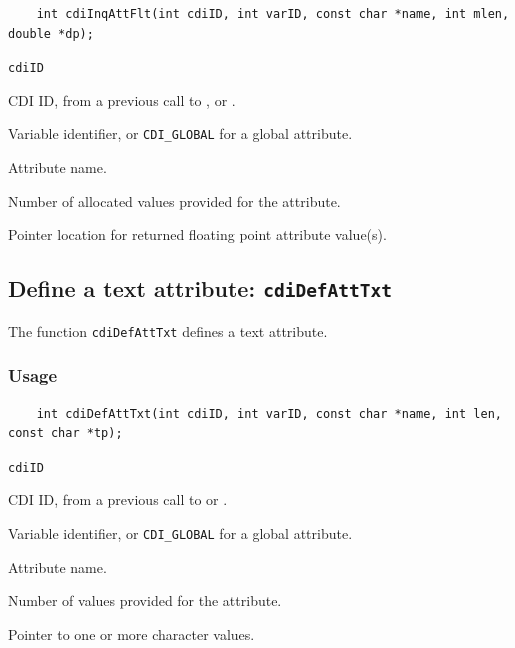 \begin{verbatim}
    int cdiInqAttFlt(int cdiID, int varID, const char *name, int mlen, double *dp);
\end{verbatim}

\hspace*{4mm}\begin{minipage}[]{15cm}
\begin{deflist}{\texttt{cdiID}\ }
\item[\texttt{cdiID}]
CDI ID, from a previous call to {}, {} or {}.
\item[\texttt{varID}]
Variable identifier, or {\texttt{CDI\_GLOBAL}} for a global attribute.
\item[\texttt{name}]
Attribute name.
\item[\texttt{mlen}]
Number of allocated values provided for the attribute.
\item[\texttt{dp}]
Pointer location for returned floating point attribute value(s).

\end{deflist}
\end{minipage}


\subsection{Define a text attribute: \texttt{cdiDefAttTxt}}
\label{cdiDefAttTxt}

The function {\texttt{cdiDefAttTxt}} defines a text attribute.

\subsubsection*{Usage}

\begin{verbatim}
    int cdiDefAttTxt(int cdiID, int varID, const char *name, int len, const char *tp);
\end{verbatim}

\hspace*{4mm}\begin{minipage}[]{15cm}
\begin{deflist}{\texttt{cdiID}\ }
\item[\texttt{cdiID}]
CDI ID, from a previous call to {} or {}.
\item[\texttt{varID}]
Variable identifier, or {\texttt{CDI\_GLOBAL}} for a global attribute.
\item[\texttt{name}]
Attribute name.
\item[\texttt{len}]
Number of values provided for the attribute.
\item[\texttt{tp}]
Pointer to one or more character values.

\end{deflist}
\end{minipage}


